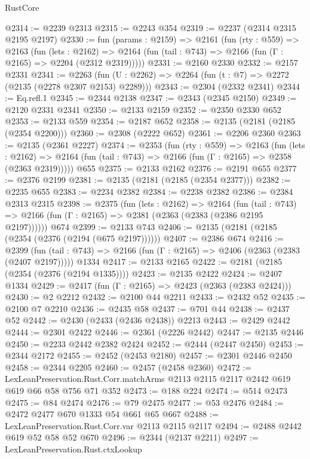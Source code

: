 \begin{lexlean}{RustCore}
\begin{coremodule}
@2314 := @2239 @2313
@2315 := @2243 @354
@2319 := @2237 (@2314 @2315 @2195 @2197)
@2330 := fun (params : @2159) =>
  @2161
    (fun (rty : @559) =>
    @2163
      (fun (lets : @2162) =>
      @2164 (fun (tail : @743) => @2166 (fun (Γ : @2165) => @2204 (@2312 @2319)))))
@2331 := @2160 @2330
@2332 := @2157 @2331
@2341 := @2263 (fun (U : @2262) => @2264 (fun (t : @7) => @2272 (@2135 (@2278 @2307 @2153) @2289)))
@2343 := @2304 (@2332 @2341)
@2344 := Eq.refl.{1}
@2345 := @2344 @2138
@2347 := @2343 (@2345 @2150)
@2349 := @2120 @2331 @2341
@2350 := @2133 @2159
@2352 := @2350 @2330 @652
@2353 := @2133 @559
@2354 := @2187 @652
@2358 := @2135 (@2181 (@2185 (@2354 @2200)))
@2360 := @2308 (@2222 @652)
@2361 := @2206 @2360
@2363 := @2135 (@2361 @2227)
@2374 := @2353
    (fun (rty : @559) =>
    @2163
      (fun (lets : @2162) =>
      @2164 (fun (tail : @743) => @2166 (fun (Γ : @2165) => @2358 (@2363 @2319)))))
    @655
@2375 := @2133 @2162
@2376 := @2191 @655
@2377 := @2376 @2199
@2381 := @2135 (@2181 (@2185 (@2354 @2377)))
@2382 := @2235 @655
@2383 := @2234 @2382
@2384 := @2238 @2382
@2386 := @2384 @2313 @2315
@2398 := @2375
    (fun (lets : @2162) =>
    @2164
      (fun (tail : @743) => @2166 (fun (Γ : @2165) => @2381 (@2363 (@2383 (@2386 @2195 @2197))))))
    @674
@2399 := @2133 @743
@2406 := @2135 (@2181 (@2185 (@2354 (@2376 (@2194 (@675 @2197))))))
@2407 := @2386 @674
@2416 := @2399
    (fun (tail : @743) => @2166 (fun (Γ : @2165) => @2406 (@2363 (@2383 (@2407 @2197)))))
    @1334
@2417 := @2133 @2165
@2422 := @2181 (@2185 (@2354 (@2376 (@2194 @1335))))
@2423 := @2135 @2422
@2424 := @2407 @1334
@2429 := @2417 (fun (Γ : @2165) => @2423 (@2363 (@2383 @2424)))
@2430 := @2 @2212
@2432 := @2100 @44 @2211
@2433 := @2432 @52
@2435 := @2100 @7 @2210
@2436 := @2435 @58
@2437 := @701 @44
@2438 := @2437 @52
@2442 := @2430 (@2433 (@2436 @2438)) @2213
@2443 := @2429 @2442
@2444 := @2301 @2422
@2446 := @2361 (@2226 @2442)
@2447 := @2135 @2446
@2450 := @2233 @2442 @2382 @2424
@2452 := @2444 (@2447 @2450)
@2453 := @2344 @2172
@2455 := @2452 (@2453 @2180)
@2457 := @2301 @2446 @2450
@2458 := @2344 @2205
@2460 := @2457 (@2458 @2360)
@2472 := LexLeanPreservation.Rust.Corr.matchArms
    @2113
    @2115
    @2117
    @2442
    @619
    @619
    @66
    @58
    @756
    @71
    @352
@2473 := @188 @224
@2474 := @514 @2473
@2475 := @84 @2474
@2476 := @79 @2475
@2477 := @53 @2476
@2484 := @2472 @2477 @670 @1333 @54 @661 @65 @667
@2488 := LexLeanPreservation.Rust.Corr.var @2113 @2115 @2117
@2494 := @2488 @2442 @619 @52 @58 @52 @670
@2496 := @2344 (@2137 @2211)
@2497 := LexLeanPreservation.Rust.ctxLookup

\end{coremodule}
\end{lexlean}

